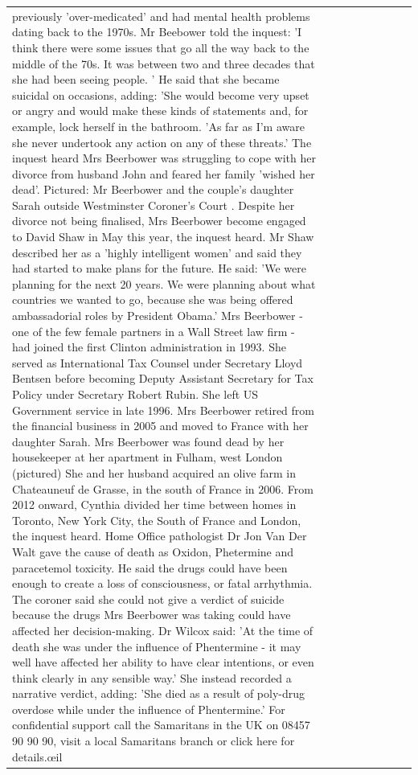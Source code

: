 \begin{table}[H]
\begin{tabular}{lllrlllll}
previously 'over-medicated' and had mental health problems dating back to the 1970s. Mr Beebower told the inquest: 'I think there were some issues that go all the way back to the middle of the 70s. It was between two and three decades that she had been seeing people. ' He said that she became suicidal on occasions, adding: 'She would become very upset or angry and would make these kinds of statements and, for example, lock herself in the bathroom. 'As far as I'm aware she never undertook any action on any of these threats.' The inquest heard Mrs Beerbower was struggling to cope with her divorce from husband John and feared her family 'wished her dead'. Pictured: Mr Beerbower and the couple's daughter Sarah outside Westminster Coroner's Court . Despite her divorce not being finalised, Mrs Beerbower become engaged to David Shaw in May this year, the inquest heard. Mr Shaw described her as a 'highly intelligent women' and said they had started to make plans for the future. He said: 'We were planning for the next 20 years. We were planning about what countries we wanted to go, because she was being offered ambassadorial roles by President Obama.' Mrs Beerbower - one of the few female partners in a Wall Street law firm - had joined the first Clinton administration in 1993. She served as International Tax Counsel under Secretary Lloyd Bentsen before becoming Deputy Assistant Secretary for Tax Policy under Secretary Robert Rubin. She left US Government service in late 1996. Mrs Beerbower retired from the financial business in 2005 and moved to France with her daughter Sarah. Mrs Beerbower was found dead by her housekeeper at her apartment in Fulham, west London (pictured) She and her husband acquired an olive farm in Chateauneuf de Grasse, in the south of France in 2006. From 2012 onward, Cynthia divided her time between homes in Toronto, New York City, the South of France and London, the inquest heard. Home Office pathologist Dr Jon Van Der Walt gave the cause of death as Oxidon, Phetermine and paracetemol toxicity. He said the drugs could have been enough to create a loss of consciousness, or fatal arrhythmia. The coroner said she could not give a verdict of suicide because the drugs Mrs Beerbower was taking could have affected her decision-making. Dr Wilcox said: 'At the time of death she was under the influence of Phentermine - it may well have affected her ability to have clear intentions, or even think clearly in any sensible way.' She instead recorded a narrative verdict, adding: 'She died as a result of poly-drug overdose while under the influence of Phentermine.' For confidential support call the Samaritans in the UK on 08457 90 90 90, visit a local Samaritans branch or click here for details.œil \\

\end{tabular}
\end{table}
